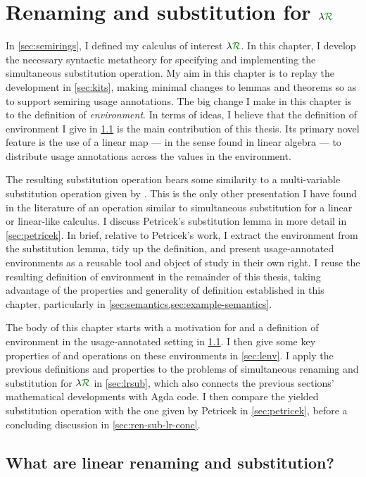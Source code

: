\chapter{Renaming and substitution for $\name$}\label{sec:ren-sub-lr}

In \cref{sec:semirings}, I defined my calculus of interest $\name$.
In this chapter, I develop the necessary syntactic metatheory for
specifying and implementing the simultaneous substitution operation.
My aim in this chapter is to replay the development in \cref{sec:kits}, making
minimal changes to lemmas and theorems so as to support semiring usage
annotations.
The big change I make in this chapter is to the definition of
\emph{environment}.
In terms of ideas, I believe that the definition of environment I give in
\cref{sec:lrkits} is the main contribution of this thesis.
Its primary novel feature is the use of a linear map --- in the sense found in
linear algebra --- to distribute usage annotations across the values in the
environment.

The resulting substitution operation bears some similarity to a multi-variable
substitution operation given by \citet{petricek-thesis}.
This is the only other presentation I have found in the literature of an
operation similar to simultaneous substitution for a linear or linear-like
calculus.
I discuss Petricek's substitution lemma in more detail in \cref{sec:petricek}.
In brief, relative to Petricek's work, I extract the environment from the
substitution lemma, tidy up the definition, and present usage-annotated
environments as a reusable tool and object of study in their own right.
I reuse the resulting definition of environment in the remainder of this thesis,
taking advantage of the properties and generality of definition established in
this chapter, particularly in \cref{sec:semantics,sec:example-semantics}.

The body of this chapter starts with a motivation for and a definition of
environment in the usage-annotated setting in \cref{sec:lrkits}.
I then give some key properties of and operations on these environments in
\cref{sec:lenv}.
I apply the previous definitions and properties to the problems of simultaneous
renaming and substitution for $\name$ in \cref{sec:lrsub}, which also connects
the previous sections' mathematical developments with Agda code.
I then compare the yielded substitution operation with the one given by Petricek
in \cref{sec:petricek}, before a concluding discussion in
\cref{sec:ren-sub-lr-conc}.

\section{What are linear renaming and substitution?}\label{sec:lrkits}

